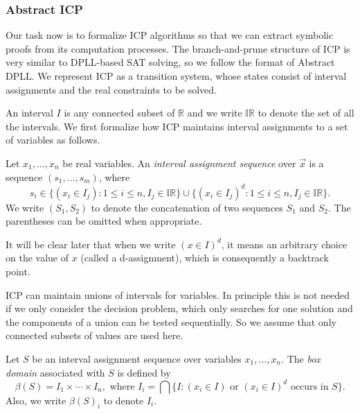 \documentclass[12pt]{article}
\begin{document}
\subsubsection{Abstract ICP} Our task now is to formalize ICP algorithms
so that we can extract symbolic proofs from its computation processes. The
branch-and-prune structure of ICP is very similar to DPLL-based SAT solving, so
we follow the format of Abstract DPLL. We represent ICP
as a transition system, whose states consist of interval assignments and the
real constraints to be solved.

An interval $I$ is any connected subset of
$\mathbb{R}$ and we write $\mathbb{IR}$ to denote the set of all the intervals.
We first formalize how ICP maintains interval assignments to a set of variables
as follows.
\begin{definition}
Let $x_1,...,x_n$ be real variables. An {\em interval assignment sequence} over
$\vec x$ is a sequence $(s_1,...,s_m)$, where
$$s_i\in \{(x_i\in I_j): 1\leq i\leq n, I_j\in
\mathbb{IR}\}\cup\{(x_i\in I_j)^d: 1\leq i\leq n, I_j\in
\mathbb{IR}\}.
$$
We write $(S_1, S_2)$ to denote the concatenation of two sequences $S_1$ and
$S_2$. The parentheses can be omitted when appropriate.
\end{definition}
It will be clear later that when we write $(x\in I)^d$, it means an arbitrary
choice on the value of $x$ (called a d-assignment), which is consequently a backtrack point.
\begin{remark}
ICP can maintain unions of intervals for variables. In principle this is not
needed if we only consider the decision problem, which only searches for
one solution and the components of a union can be tested sequentially. So we
assume that only connected subsets of values are used here.
\end{remark}

\begin{definition}
Let $S$ be an interval assignment sequence over variables $x_1,...,x_n$. The
{\em box
domain} associated with $S$ is defined by
$$\beta(S) = I_1\times\cdots \times I_n, \mbox{ where }I_i = \bigcap\{ I:
(x_i\in
I)\mbox{ or } (x_i\in I)^d \mbox{ occurs in } S\}.$$
Also, we write $\beta(S)_i$ to denote $I_i$.
\end{definition}
\end{document}
